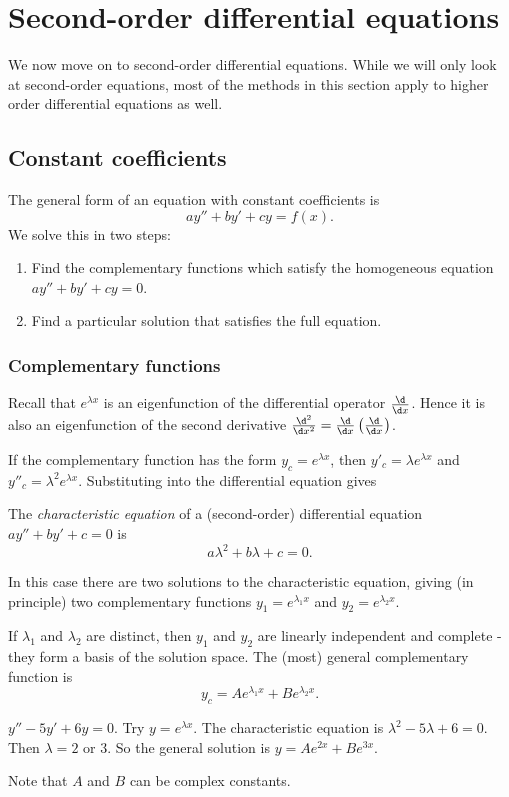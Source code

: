 \documentclass[a4paper]{article}
\begin{document}
\section{Second-order differential equations}
We now move on to second-order differential equations. While we will only look at second-order equations, most of the methods in this section apply to higher order differential equations as well.
\subsection{Constant coefficients}
The general form of an equation with constant coefficients is
\[
  ay'' + by' + cy = f(x).
\]
We solve this in two steps:
\begin{enumerate}
  \item Find the complementary functions which satisfy the homogeneous equation $ay'' + by' + cy = 0$.
  \item Find a particular solution that satisfies the full equation.
\end{enumerate}
\subsubsection{Complementary functions}
Recall that $e^{\lambda x}$ is an eigenfunction of the differential operator $\frac{\d}{\d x}$. Hence it is also an eigenfunction of the second derivative $\frac{\d^2}{\d x^2} = \frac{\d}{\d x}\left(\frac{\d }{\d x}\right)$.

If the complementary function has the form $y_c = e^{\lambda x}$, then $y'_c = \lambda e^{\lambda x}$ and $y''_c = \lambda^2 e^{\lambda x}$. Substituting into the differential equation gives
\begin{defi}
  The \emph{characteristic equation} of a (second-order) differential equation $ay'' + by' + c = 0$ is
  \[
    a\lambda^2 + b\lambda + c = 0.
  \]
\end{defi}

In this case there are two solutions to the characteristic equation, giving (in principle) two complementary functions $y_1 = e^{\lambda_1 x}$ and $y_2 = e^{\lambda_2 x}$.

If $\lambda_1$ and $\lambda_2$ are distinct, then $y_1$ and $y_2$ are linearly independent and complete - they form a basis of the solution space. The (most) general complementary function is
\[
  y_c = Ae^{\lambda_1 x} + Be^{\lambda_2 x}.
\]
\begin{eg}
  $y'' - 5y' + 6y = 0$. Try $y = e^{\lambda x}$. The characteristic equation is $\lambda^2 - 5\lambda + 6 = 0$. Then $\lambda = 2$ or $3$. So the general solution is $y = Ae^{2x} + Be^{3x}$.

  Note that $A$ and $B$ can be complex constants.
\end{eg}
\end{document}
